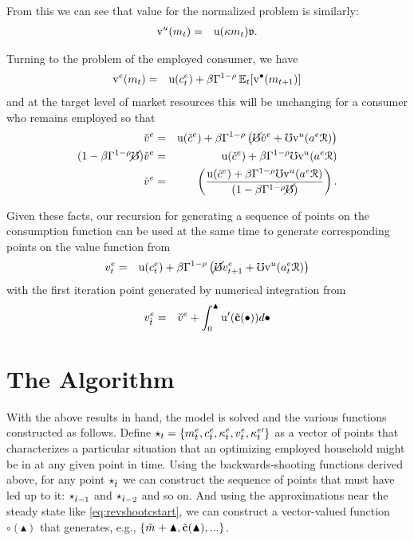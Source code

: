 \documentclass{handout}
\begin{document}
From this we can see that value for the normalized problem is similarly:
\begin{eqnarray}
  \mathrm{v}^{u}(m_{t}) & = & {\mathrm{u}}(\kappa m_{t}) \mathfrak{v}
.
\end{eqnarray}

Turning to the problem of the employed consumer, we have
\begin{eqnarray}
  \mathrm{v}^{e}(m_{t}) & = & {\mathrm{u}}(c^{e}_{t})+\beta \Gamma^{1-\rho} \operatorname{\mathbb{E}}_{t}[\mathrm{v}^{\bullet}(m_{t+1})]
\end{eqnarray}
and at the target level of market resources this will be unchanging for a consumer who
remains employed so that 
\begin{eqnarray}
  \check{v}^{e} & = & {\mathrm{u}}(\check{c}^{e})+\beta \Gamma^{1-\rho} \left(\cancel{\mho} \check{v}^{e} + \mho \mathrm{v}^{u}(a^{e} \mathcal{R})\right)
\\ (1-\beta \Gamma^{1-\rho} \cancel{\mho}) \check{v}^{e} & = & {\mathrm{u}}(\check{c}^{e})+\beta \Gamma^{1-\rho} \mho \mathrm{v}^{u}(a^{e} \mathcal{R})
\\ \check{v}^{e} & = & \left(\frac{{\mathrm{u}}(\check{c}^{e})+\beta \Gamma^{1-\rho} \mho \mathrm{v}^{u}(a^{e} \mathcal{R})}{(1-\beta \Gamma^{1-\rho} \cancel{\mho}) }\right)
.
\end{eqnarray}

Given these facts, our recursion for generating a sequence of points on the consumption
function can be used at the same time to generate corresponding points on the value function from
\begin{eqnarray}
  {v}^{e}_{t} & = & {\mathrm{u}}(c^{e}_{t})+\beta \Gamma^{1-\rho} \left(\cancel{\mho} {v}^{e}_{t+1} + \mho \mathrm{v}^{u}(a^{e}_{t} \mathcal{R})\right)
\end{eqnarray}
with the first iteration point generated by numerical integration from 
\begin{eqnarray}
  v^{e}_{\grave{t}} & = & \check{v}^{e}+\int_{0}^{\blacktriangle} {\mathrm{u}^{\prime}}(\tilde{\mathbf{c}}(\bullet)) d\bullet
\end{eqnarray}



\section{The Algorithm}

With the above results in hand, the model is solved and the various
functions constructed as follows.  Define $\star_{t} =
\{m^{e}_{t},c^{e}_{t},\kappa^{e}_{t},{v}^{e}_{t},\kappa_{t}^{e\prime}\}$ as a vector of points that
characterizes a particular situation that an optimizing employed
household might be in at any given point in time.  Using the backwards-shooting 
functions derived above, for any point $\star_{\grave{t}}$ we can construct the
sequence of points that must have led up to it: $\star_{\grave{t}-1}$ and
$\star_{\grave{t}-2}$ and so on.  And using the approximations near the
steady state like \eqref{eq:revshootcstart}, we can construct 
a vector-valued function $\pmb{\circ}(\blacktriangle)$ that generates, 
e.g., $\{\mTarg^{\null}+\blacktriangle,\tilde{\mathbf{c}}(\blacktriangle), ... \}$.
\end{document}
